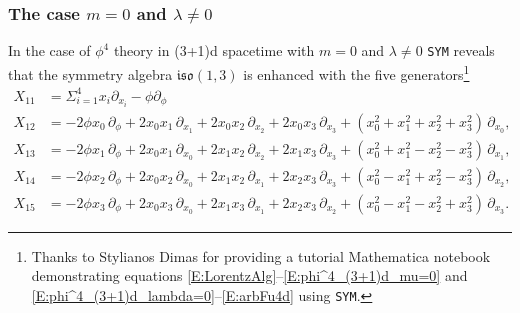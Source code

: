\documentclass[a4paper,hidelinks, 12pt]{article}
\numberwithin{equation}{section}
\theoremstyle{plain}
\newcommand{\La}{\mathfrak}
\newcommand{\nn}{\nonumber}
\begin{document}
\subsubsection{The case $m=0$ and $\lambda\ne 0$}
\label{sec:TheCaseMu0lne0}
In the case of $\phi^4$ theory in (3+1)d spacetime with $m=0$ and $\lambda\ne 0$
\texttt{SYM} \cite{dimas2005sym} reveals that the symmetry algebra $\La{iso}(1,3)$ is enhanced with the five generators\footnote{Thanks to Stylianos Dimas for providing a tutorial Mathematica notebook demonstrating equations \eqref{E:LorentzAlg}--\eqref{E:phi^4_(3+1)d_mu=0} and
\eqref{E:phi^4_(3+1)d_lambda=0}--\eqref{E:arbFu4d} using \texttt{SYM}.}
\begin{align}\label{E:phi^4_(3+1)d_mu=0}
	X_{11} &= \Sigma_{i=1}^4 x_i\partial_{x_i} -\phi \partial_\phi         \nn \\
	X_{12} &= - 2 \phi x_{0} \, \partial_{\phi} + 2 x_{0} x_{1} \, \partial_{x_1} + 2 x_{0} x_{2} \, \partial_{x_2} + 2 x_{0} x_{3} \, \partial_{x_3} + (x_{0}^2 + x_{1}^2 + x_{2}^2 + x_{3}^2) \, \partial_{x_0},        \nn \\
	X_{13} &= - 2 \phi x_{1} \, \partial_{\phi} + 2 x_{0} x_{1} \, \partial_{x_0} + 2 x_{1} x_{2} \, \partial_{x_2} + 2 x_{1} x_{3} \, \partial_{x_3} + (x_{0}^2 + x_{1}^2 - x_{2}^2 - x_{3}^2) \, \partial_{x_1},        \nn \\
	X_{14} &=   - 2 \phi x_{2} \, \partial_{\phi} + 2 x_{0} x_{2} \, \partial_{x_0} + 2 x_{1} x_{2} \, \partial_{x_1} + 2 x_{2} x_{3} \, \partial_{x_3} + (x_{0}^2 - x_{1}^2 + x_{2}^2 - x_{3}^2) \, \partial_{x_2},     \nn \\
	X_{15} &=  - 2 \phi x_{3} \, \partial_{\phi} + 2 x_{0} x_{3} \, \partial_{x_0} + 2 x_{1} x_{3} \, \partial_{x_1} + 2 x_{2} x_{3} \, \partial_{x_2} + (x_{0}^2 - x_{1}^2 - x_{2}^2 + x_{3}^2) \, \partial_{x_3}.              
\end{align}
 
\end{document}
